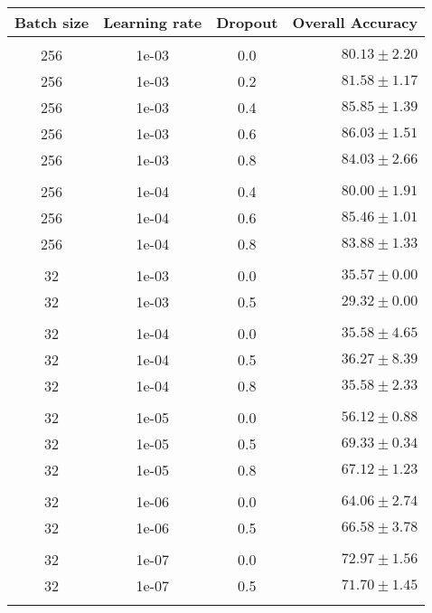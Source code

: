 \begin{table}[H]
  \centering
  \begin{tabular}{cccr} 
      Batch size & Learning rate & Dropout & Overall Accuracy\\[0.2cm] 
      \hline \\[-0.2cm]
      256 &   1e-03 &   0.0 & $80.13 \pm 2.20$\\
      256 &   1e-03 &   0.2 & $81.58 \pm 1.17$\\
      256 &   1e-03 &   0.4 & $85.85 \pm 1.39$\\
      256 &   1e-03 &   0.6 & $\mathbf{86.03 \pm 1.51}$\\
      256 &   1e-03 &   0.8 & $84.03 \pm 2.66$\\[0.05cm] \hline \\[-0.25cm]

      256 &   1e-04 &   0.4 & $80.00 \pm 1.91$\\
      256 &   1e-04 &   0.6 & $85.46 \pm 1.01$\\
      256 &   1e-04 &   0.8 & $83.88 \pm 1.33$\\[0.05cm] \hline \\[-0.25cm]

      32  &   1e-03 & 0.0 & $35.57 \pm 0.00$\\
      32  &   1e-03 & 0.5 & $29.32 \pm 0.00$\\[0.05cm] \hline \\[-0.25cm]

      32  &   1e-04 & 0.0 & $35.58 \pm 4.65$\\
      32  &   1e-04 & 0.5 & $36.27 \pm 8.39$\\
      32  &   1e-04 & 0.8 & $35.58 \pm 2.33$\\[0.05cm] \hline \\[-0.25cm]

      32  &   1e-05 & 0.0 & $56.12 \pm 0.88$\\
      32  &   1e-05 & 0.5 & $69.33 \pm 0.34$\\
      32  &   1e-05 & 0.8 & $67.12 \pm 1.23$\\[0.05cm] \hline \\[-0.25cm]

      32  &   1e-06 & 0.0 & $64.06 \pm 2.74$\\
      32  &   1e-06 & 0.5 & $66.58 \pm 3.78$\\[0.05cm] \hline \\[-0.25cm]

      32  &   1e-07 & 0.0 & $72.97 \pm 1.56$\\
      32  &   1e-07 & 0.5 & $71.70 \pm 1.45$\\[0.05cm] \hline \\[-0.25cm]


\end{tabular}
\end{table}
